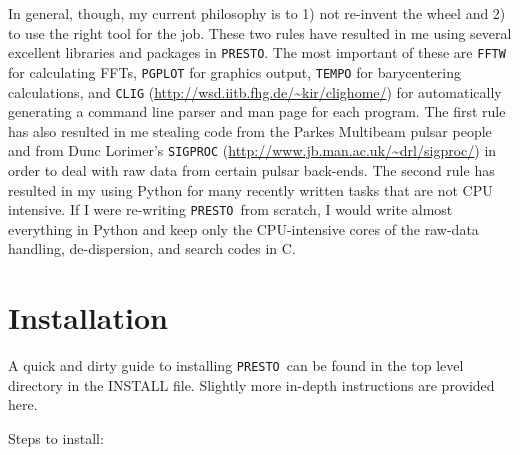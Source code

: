\documentclass[11pt]{article}
\newcommand{\PRESTO}{{\tt PRESTO}}
\begin{document}
In general, though, my current philosophy is to 1) not re-invent the
wheel and 2) to use the right tool for the job.  These two rules have
resulted in me using several excellent libraries and packages in
\PRESTO.  The most important of these are {\tt FFTW} for calculating
FFTs, {\tt PGPLOT} for graphics output, {\tt TEMPO} for barycentering
calculations, and {\tt CLIG}
(\url{http://wsd.iitb.fhg.de/~kir/clighome/}) for automatically
generating a command line parser and man page for each program.  The
first rule has also resulted in me stealing code from the Parkes
Multibeam pulsar people and from Dunc Lorimer's {\tt SIGPROC}
(\url{http://www.jb.man.ac.uk/~drl/sigproc/}) in order to deal with
raw data from certain pulsar back-ends.  The second rule has resulted
in my using Python for many recently written tasks that are not CPU
intensive.  If I were re-writing \PRESTO\ from scratch, I would write
almost everything in Python and keep only the CPU-intensive cores of
the raw-data handling, de-dispersion, and search codes in C.

\section{Installation}

A quick and dirty guide to installing \PRESTO\ can be found in the top
level directory in the INSTALL file.  Slightly more in-depth
instructions are provided here.

Steps to install:
\end{document}
